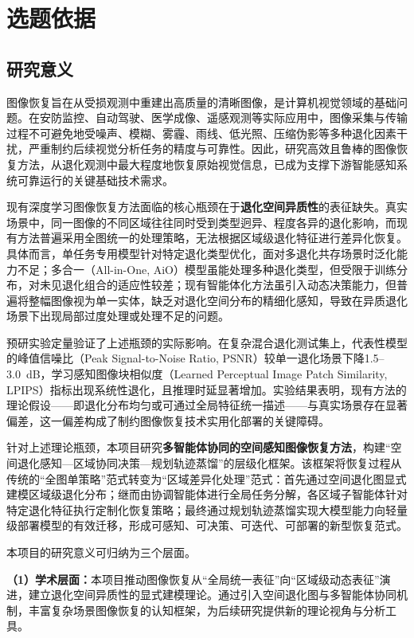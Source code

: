 \section{选题依据}

\subsection{研究意义}

图像恢复旨在从受损观测中重建出高质量的清晰图像，是计算机视觉领域的基础问题。在安防监控、自动驾驶、医学成像、遥感观测等实际应用中，图像采集与传输过程不可避免地受噪声、模糊、雾霾、雨线、低光照、压缩伪影等多种退化因素干扰，严重制约后续视觉分析任务的精度与可靠性。因此，研究高效且鲁棒的图像恢复方法，从退化观测中最大程度地恢复原始视觉信息，已成为支撑下游智能感知系统可靠运行的关键基础技术需求。

现有深度学习图像恢复方法面临的核心瓶颈在于\textbf{退化空间异质性}的表征缺失。真实场景中，同一图像的不同区域往往同时受到类型迥异、程度各异的退化影响，而现有方法普遍采用全图统一的处理策略，无法根据区域级退化特征进行差异化恢复。具体而言，单任务专用模型\cite{swinir,restormer}针对特定退化类型优化，面对多退化共存场景时泛化能力不足；多合一（All-in-One, AiO）模型\cite{airnet,promptir,instructir}虽能处理多种退化类型，但受限于训练分布，对未见退化组合的适应性较差；现有智能体化方法虽引入动态决策能力，但普遍将整幅图像视为单一实体，缺乏对退化空间分布的精细化感知，导致在异质退化场景下出现局部过度处理或处理不足的问题。

预研实验定量验证了上述瓶颈的实际影响。在复杂混合退化测试集上，代表性模型的峰值信噪比（Peak Signal-to-Noise Ratio, PSNR）较单一退化场景下降1.5--3.0~dB，学习感知图像块相似度（Learned Perceptual Image Patch Similarity, LPIPS）指标出现系统性退化，且推理时延显著增加。实验结果表明，现有方法的理论假设——即退化分布均匀或可通过全局特征统一描述——与真实场景存在显著偏差，这一偏差构成了制约图像恢复技术实用化部署的关键障碍。

针对上述理论瓶颈，本项目研究\textbf{多智能体协同的空间感知图像恢复方法}，构建“空间退化感知—区域协同决策—规划轨迹蒸馏”的层级化框架。该框架将恢复过程从传统的“全图单策略”范式转变为“区域差异化处理”范式：首先通过空间退化图显式建模区域级退化分布；继而由协调智能体进行全局任务分解，各区域子智能体针对特定退化特征执行定制化恢复策略；最终通过规划轨迹蒸馏实现大模型能力向轻量级部署模型的有效迁移，形成可感知、可决策、可迭代、可部署的新型恢复范式。

本项目的研究意义可归纳为三个层面。

\textbf{（1）学术层面：}本项目推动图像恢复从“全局统一表征”向“区域级动态表征”演进，建立退化空间异质性的显式建模理论。通过引入空间退化图与多智能体协同机制，丰富复杂场景图像恢复的认知框架，为后续研究提供新的理论视角与分析工具。

